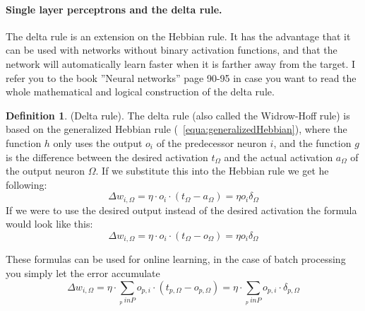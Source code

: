 \documentclass[pdftex,a4paper,12pt,twoside]{report}
\theoremstyle{plain} \newtheorem{theorem}{Theorem} \newtheorem{proposition}{Proposition} \newtheorem{lemma}{Lemma} \newtheorem*{corollary}{Corollary}
\theoremstyle{definition} \newtheorem{definition}{Definition} \newtheorem{conjecture}{Conjecture} \newtheorem*{example}{Example} \newtheorem{algorithm}{Algorithm}
\theoremstyle{remark} \newtheorem*{remark}{Remark} \newtheorem*{note}{Note} \newtheorem{case}{Case}
\begin{document}
\paragraph{Single layer perceptrons and the delta rule.}
The delta rule is an extension on the Hebbian rule. It has the advantage that it can be used with networks without binary activation functions, and that the network will automatically learn faster when it is farther away from the target. I refer you to the book ''Neural networks'' page 90-95 \citep{Kriesel2013} in case you want to read the whole mathematical and logical construction of the delta rule.
\begin{definition}
(Delta rule). The delta rule (also called the Widrow-Hoff rule) is based on the generalized Hebbian rule (~\ref{equa:generalizedHebbian}), where the function $h$ only uses the output $o_i$ of the predecessor neuron $i$, and the function $g$ is the difference between the desired activation $t_\Omega$ and the actual activation $a_\Omega$ of the output neuron $\Omega$. If we substitute this into the Hebbian rule we get he following:
\begin{equation}
\Delta w_{i,\Omega} = \eta \cdot o_i \cdot (t_\Omega - a_\Omega) = \eta o_i \delta_\Omega
\end{equation}
\label{equa:deltaSLP}
If we were to use the desired output instead of the desired activation the formula would look like this:
\begin{equation}
\Delta w_{i,\Omega} = \eta \cdot o_i \cdot (t_\Omega - o_\Omega) = \eta o_i \delta_\Omega
\end{equation}
\end{definition}
These formulas can be used for online learning, in the case of batch processing you simply let the error accumulate
\begin{equation}
\Delta w_{i,\Omega} = \eta \cdot \sum_{_{p} \ in P} o_{p,i} \cdot (t_{p,\Omega} - o_{p,\Omega}) = \eta \cdot \sum_{_{p} \ in P} o_{p,i} \cdot \delta_{p,\Omega}
\end{equation}
\end{document}
